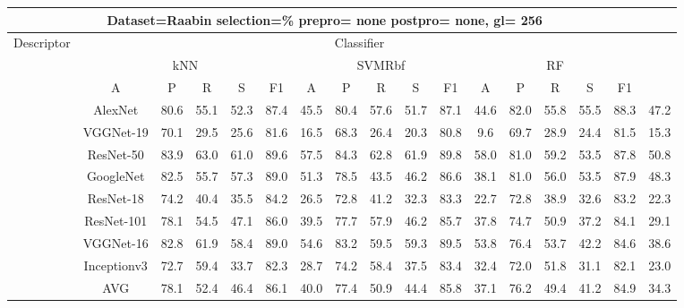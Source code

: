 \documentclass[12pt,italian]{article}
\begin{document}
\begin{tiny}
\begin{longtable}{lcccccccccccccccc}
\toprule
\multicolumn{16}{c}{Dataset=Raabin selection=\% prepro= none postpro= none, gl= 256} \\ 
\toprule
Descriptor & \multicolumn{15}{c}{Classifier} \\ 
& \multicolumn{5}{c}{kNN} & \multicolumn{5}{c}{SVMRbf} & \multicolumn{5}{c}{RF} \\ 
& A & P & R & S & F1 & A & P & R & S & F1 & A & P & R & S & F1 \\ 
\midrule
& AlexNet & 80.6 & 55.1 & 52.3 & 87.4 & 45.5 & 80.4 & 57.6 & 51.7 & 87.1 & 44.6 & 82.0 & 55.8 & 55.5 & 88.3 & 47.2 \\ 
& VGGNet-19 & 70.1 & 29.5 & 25.6 & 81.6 & 16.5 & 68.3 & 26.4 & 20.3 & 80.8 &  9.6 & 69.7 & 28.9 & 24.4 & 81.5 & 15.3 \\ 
& ResNet-50 & 83.9 & 63.0 & 61.0 & 89.6 & 57.5 & 84.3 & 62.8 & 61.9 & 89.8 & 58.0 & 81.0 & 59.2 & 53.5 & 87.8 & 50.8 \\ 
& GoogleNet & 82.5 & 55.7 & 57.3 & 89.0 & 51.3 & 78.5 & 43.5 & 46.2 & 86.6 & 38.1 & 81.0 & 56.0 & 53.5 & 87.9 & 48.3 \\ 
& ResNet-18 & 74.2 & 40.4 & 35.5 & 84.2 & 26.5 & 72.8 & 41.2 & 32.3 & 83.3 & 22.7 & 72.8 & 38.9 & 32.6 & 83.2 & 22.3 \\ 
& ResNet-101 & 78.1 & 54.5 & 47.1 & 86.0 & 39.5 & 77.7 & 57.9 & 46.2 & 85.7 & 37.8 & 74.7 & 50.9 & 37.2 & 84.1 & 29.1 \\ 
& VGGNet-16 & 82.8 & 61.9 & 58.4 & 89.0 & 54.6 & 83.2 & 59.5 & 59.3 & 89.5 & 53.8 & 76.4 & 53.7 & 42.2 & 84.6 & 38.6 \\ 
& Inceptionv3 & 72.7 & 59.4 & 33.7 & 82.3 & 28.7 & 74.2 & 58.4 & 37.5 & 83.4 & 32.4 & 72.0 & 51.8 & 31.1 & 82.1 & 23.0 \\ 
\hline
& AVG & 78.1 & 52.4 & 46.4 & 86.1 & 40.0 & 77.4 & 50.9 & 44.4 & 85.8 & 37.1 & 76.2 & 49.4 & 41.2 & 84.9 & 34.3 \\ 
\hline
\bottomrule
\end{longtable} 

 \pagebreak 
\end{tiny} 
 
\end{document}
